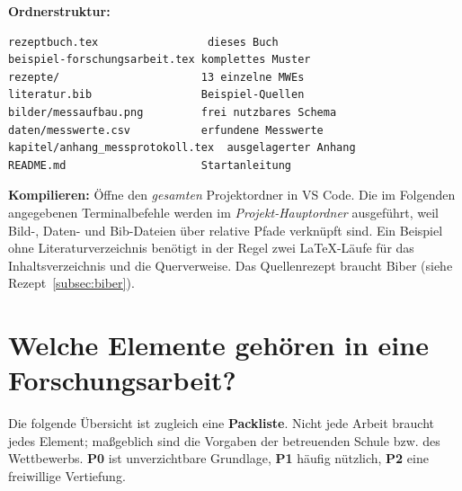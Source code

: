 \documentclass[11pt,a4paper,parskip=half]{scrartcl} %
\begin{document}
\textbf{Ordnerstruktur:}
\begin{lstlisting}[language={},numbers=none]
rezeptbuch.tex                 dieses Buch
beispiel-forschungsarbeit.tex komplettes Muster
rezepte/                      13 einzelne MWEs
literatur.bib                 Beispiel-Quellen
bilder/messaufbau.png         frei nutzbares Schema
daten/messwerte.csv           erfundene Messwerte
kapitel/anhang_messprotokoll.tex  ausgelagerter Anhang
README.md                     Startanleitung
\end{lstlisting}

\textbf{Kompilieren:} Öffne den \emph{gesamten} Projektordner in VS Code.
Die im Folgenden angegebenen Terminalbefehle werden im \emph{Projekt-Hauptordner}
ausgeführt, weil Bild-, Daten- und Bib-Dateien über relative Pfade verknüpft sind.
Ein Beispiel ohne Literaturverzeichnis benötigt in der Regel zwei LaTeX-Läufe
für das Inhaltsverzeichnis und die Querverweise. Das Quellenrezept braucht Biber
(siehe Rezept~\ref{subsec:biber}).

\section{Welche Elemente gehören in eine Forschungsarbeit?}
\label{sec:elemente}
Die folgende Übersicht ist zugleich eine \textbf{Packliste}. Nicht jede Arbeit
braucht jedes Element; maßgeblich sind die Vorgaben der betreuenden Schule bzw.
des Wettbewerbs. \textbf{P0} ist unverzichtbare Grundlage, \textbf{P1} häufig
nützlich, \textbf{P2} eine freiwillige Vertiefung.
\end{document}
